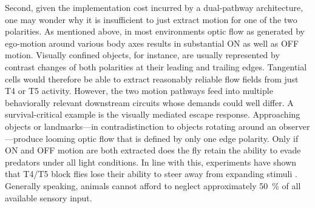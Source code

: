 Second, given the implementation cost incurred by a dual-pathway architecture, one may wonder why it is insufficient to just extract motion for one of the two polarities. As mentioned above, in most environments optic flow as generated by ego-motion around various body axes results in substantial ON as well as OFF motion. Visually confined objects, for instance, are usually represented by contrast changes of both polarities at their leading and trailing edges. Tangential cells would therefore be able to extract reasonably reliable flow fields from just T4 or T5 activity. However, the two motion pathways feed into multiple behaviorally relevant downstream circuits whose demands could well differ. A survival-critical example is the visually mediated escape response. Approaching objects or landmarks---in contradistinction to objects rotating around an observer---produce looming optic flow that is defined by only one edge polarity. Only if ON and OFF motion are both extracted does the fly retain the ability to evade predators under all light conditions. In line with this, experiments have shown that T4/T5 block flies lose their ability to steer away from expanding stimuli \citep{Schilling:2015jh}. Generally speaking, animals cannot afford to neglect approximately \SI{50}{\percent} of all available sensory input.


